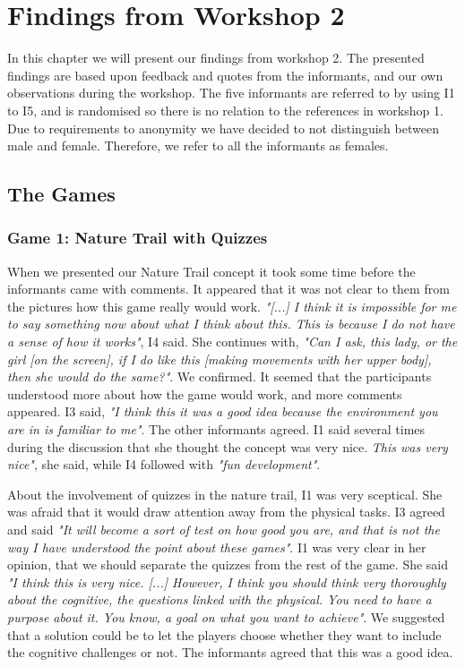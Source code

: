 \chapter{Findings from Workshop 2}
\label{chap:findW2}

In this chapter we will present our findings from workshop 2. The presented findings are based upon feedback and quotes from the informants, and our own observations during the workshop. The five informants are referred to by using I1 to I5, and is randomised so there is no relation to the references in workshop 1. Due to requirements to anonymity we have decided to not distinguish between male and female. Therefore, we refer to all the informants as females. 

\section{The Games}

\subsection{Game 1: Nature Trail with Quizzes}

When we presented our Nature Trail concept it took some time before the informants came with comments. It appeared that it was not clear to them from the pictures how this game really would work. \emph{"[...] I think it is impossible for me to say something now about what I think about this. This is because I do not have a sense of how it works"}, I4 said. She continues with, \emph{"Can I ask, this lady, or the girl [on the screen], if I do like this [making movements with her upper body], then she would do the same?"}. We confirmed. It seemed that the participants understood more about how the game would work, and more comments appeared. I3 said, \emph{"I think this it was a good idea because the environment you are in is familiar to me"}. The other informants agreed. I1 said several times during the discussion that she thought the concept was very nice. \emph{This was very nice"}, she said, while I4 followed with \emph{"fun development"}.  

About the involvement of quizzes in the nature trail, I1 was very sceptical. She was afraid that it would draw attention away from the physical tasks. I3 agreed and said \emph{"It will become a sort of test on how good you are, and that is not the way I have understood the point about these games"}. I1 was very clear in her opinion, that we should separate the quizzes from the rest of the game. She said \emph{"I think this is very nice. [...] However, I think you should think very thoroughly about the cognitive, the questions linked with the physical. You need to have a purpose about it. You know, a goal on what you want to achieve"}. We suggested that a solution could be to let the players choose whether they want to include the cognitive challenges or not. The informants agreed that this was a good idea.

